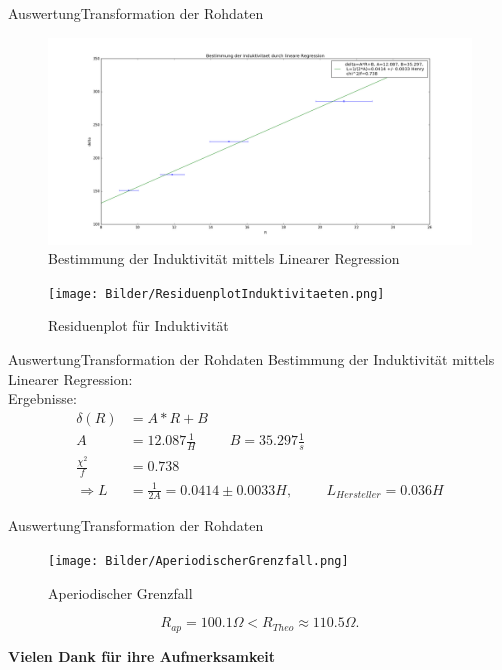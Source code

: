 \documentclass[11pt]{beamer}
\begin{document}
\begin{frame}{Auswertung}{Transformation der Rohdaten}
\begin{figure}[H]
\caption{Bestimmung der Induktivität mittels Linearer Regression}
\centering
\includegraphics[scale=0.2]{Bilder/Induktivität_linreg.png}
\end{figure}
\end{frame}

\begin{frame}
\begin{figure}[H]
 \caption{Residuenplot für Induktivität}
 \centering
 \texttt{[image: Bilder/ResiduenplotInduktivitaeten.png]}
\end{figure}
\end{frame}

\begin{frame}{Auswertung}{Transformation der Rohdaten}
Bestimmung der Induktivität mittels Linearer Regression: \\
Ergebnisse:
\begin{align*}
\delta(R) &= A*R+B \\
A&=12.087 \frac{1}{H} \hspace{1cm} B=35.297 \frac{1}{s} \\
\frac{\chi^2}{f}&=0.738 \\
\Rightarrow L&=\frac{1}{2A}=0.0414 \pm 0.0033 H, \hspace{1cm} L_{Hersteller}=0.036 H
\end{align*}
\end{frame}

\begin{frame}{Auswertung}{Transformation der Rohdaten}
\begin{figure}[H]
\caption{Aperiodischer Grenzfall}
\centering
\texttt{[image: Bilder/AperiodischerGrenzfall.png]}
\label{Aperiodisch_Bild}
\end{figure}
\begin{equation}
R_{ap}=100.1\Omega < R_{Theo}\approx 110.5\Omega.
\end{equation}
\end{frame}



\begin{frame}
\textbf{Vielen Dank für ihre Aufmerksamkeit}\centering
\end{frame}
\end{document}
